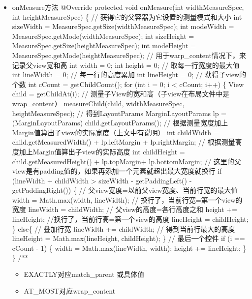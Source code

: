 \documentclass[9pt, b5paper]{article}
\begin{document}
\begin{itemize}
\item onMeasure方法
@Override
   protected void onMeasure(int widthMeasureSpec, int heightMeasureSpec)
   \{
       // 获得它的父容器为它设置的测量模式和大小
       int sizeWidth = MeasureSpec.getSize(widthMeasureSpec);
       int modeWidth = MeasureSpec.getMode(widthMeasureSpec);
       int sizeHeight = MeasureSpec.getSize(heightMeasureSpec);
       int modeHeight = MeasureSpec.getMode(heightMeasureSpec);
       // 用于warp\_content情况下，来记录父view宽和高
       int width = 0;
       int height = 0;
       // 取每一行宽度的最大值
       int lineWidth = 0;
       // 每一行的高度累加
       int lineHeight = 0;
       // 获得子view的个数
       int cCount = getChildCount();
       for (int i = 0; i < cCount; i++)
       \{
           View child = getChildAt(i);
           // 测量子View的宽和高（子view在布局文件中是wrap\_content）
           measureChild(child, widthMeasureSpec, heightMeasureSpec);
           // 得到LayoutParams
           MarginLayoutParams lp = (MarginLayoutParams) child.getLayoutParams();
           // 根据测量宽度加上Margin值算出子view的实际宽度（上文中有说明）
           int childWidth = child.getMeasuredWidth() + lp.leftMargin + lp.rightMargin;
           // 根据测量高度加上Margin值算出子view的实际高度
           int childHeight = child.getMeasuredHeight() + lp.topMargin+ lp.bottomMargin;
           // 这里的父view是有padding值的，如果再添加一个元素就超出最大宽度就换行
           if (lineWidth + childWidth > sizeWidth - getPaddingLeft() - getPaddingRight())
           \{
               // 父view宽度=以前父view宽度、当前行宽的最大值
               width = Math.max(width, lineWidth);
               // 换行了，当前行宽=第一个view的宽度
               lineWidth = childWidth;
               // 父view的高度=各行高度之和
               height += lineHeight;
               //换行了，当前行高=第一个view的高度
               lineHeight = childHeight;
           \} else\{
               // 叠加行宽
               lineWidth += childWidth;
               // 得到当前行最大的高度
               lineHeight = Math.max(lineHeight, childHeight);
           \}
           // 最后一个控件
           if (i == cCount - 1)
           \{
               width = Math.max(lineWidth, width);
               height += lineHeight;
           \}
       \}
       /**
\begin{itemize}
\item EXACTLY对应match\_parent 或具体值
\item AT\_MOST对应wrap\_content

\end{itemize}
\end{itemize}
\end{document}
